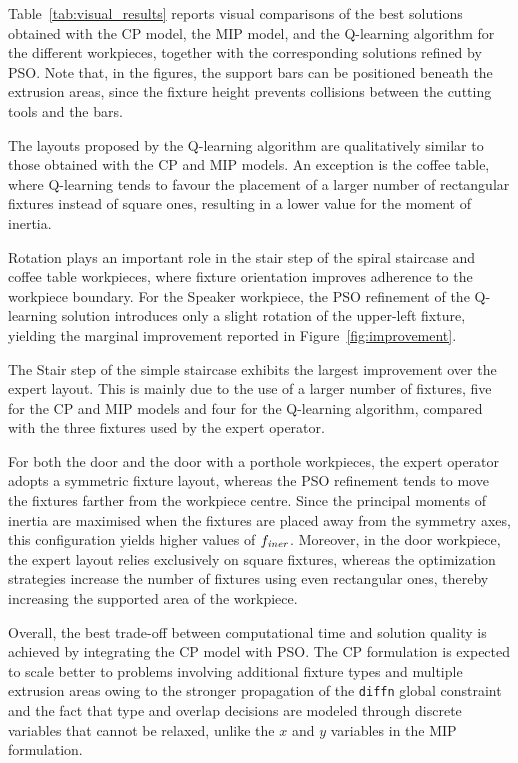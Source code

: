 Table~\ref{tab:visual_results} reports visual comparisons of the best solutions obtained with the CP model, the MIP model, and the Q-learning algorithm for the different workpieces, together with the corresponding solutions refined by PSO. Note that, in the figures, the support bars can be positioned beneath the extrusion areas, since the fixture height prevents collisions between the cutting tools and the bars.

The layouts proposed by the Q-learning algorithm are qualitatively similar to those obtained with the CP and MIP models. An exception is the coffee table, where Q-learning tends to favour the placement of a larger number of rectangular fixtures instead of square ones, resulting in a lower value for the moment of inertia.

Rotation plays an important role in the stair step of the spiral staircase and coffee table workpieces, where fixture orientation improves adherence to the workpiece boundary. For the Speaker workpiece, the PSO refinement of the Q-learning solution introduces only a slight rotation of the upper-left fixture, yielding the marginal improvement reported in Figure~\ref{fig:improvement}.

The Stair step of the simple staircase exhibits the largest improvement over the expert layout. This is mainly due to the use of a larger number of fixtures, five for the CP and MIP models and four for the Q-learning algorithm, compared with the three fixtures used by the expert operator.

For both the door and the door with a porthole workpieces, the expert operator adopts a symmetric fixture layout, whereas the PSO refinement tends to move the fixtures farther from the workpiece centre. Since the principal moments of inertia are maximised when the fixtures are placed away from the symmetry axes, this configuration yields higher values of $f_\mathit{iner}$. Moreover, in the door workpiece, the expert layout relies exclusively on square fixtures, whereas the optimization strategies increase the number of fixtures using even rectangular ones, thereby increasing the supported area of the workpiece.

Overall, the best trade-off between computational time and solution quality is achieved by integrating the CP model with PSO. The CP formulation is expected to scale better to problems involving additional fixture types and multiple extrusion areas owing to the stronger propagation of the \texttt{diffn} global constraint and the fact that type and overlap decisions are modeled through discrete variables that cannot be relaxed, unlike the $x$ and $y$ variables in the MIP formulation.

